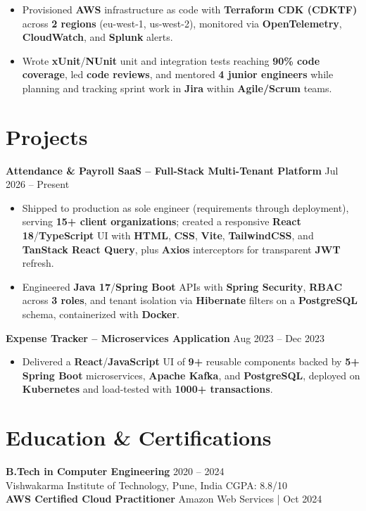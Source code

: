 \documentclass[a4paper,10pt]{article}
\begin{document}
\begin{itemize}[leftmargin=*]
    \item Provisioned \textbf{AWS} infrastructure as code with \textbf{Terraform CDK (CDKTF)} across \textbf{2 regions} (eu-west-1, us-west-2), monitored via \textbf{OpenTelemetry}, \textbf{CloudWatch}, and \textbf{Splunk} alerts.
    \item Wrote \textbf{xUnit}/\textbf{NUnit} unit and integration tests reaching \textbf{90\% code coverage}, led \textbf{code reviews}, and mentored \textbf{4 junior engineers} while planning and tracking sprint work in \textbf{Jira} within \textbf{Agile/Scrum} teams.
\end{itemize}

\section*{Projects}

\textbf{Attendance \& Payroll SaaS -- Full-Stack Multi-Tenant Platform} \hfill Jul 2026 -- Present
\begin{itemize}[leftmargin=*]
    \item Shipped to production as sole engineer (requirements through deployment), serving \textbf{15+ client organizations}; created a responsive \textbf{React 18}/\textbf{TypeScript} UI with \textbf{HTML}, \textbf{CSS}, \textbf{Vite}, \textbf{TailwindCSS}, and \textbf{TanStack React Query}, plus \textbf{Axios} interceptors for transparent \textbf{JWT} refresh.
    \item Engineered \textbf{Java 17}/\textbf{Spring Boot} APIs with \textbf{Spring Security}, \textbf{RBAC} across \textbf{3 roles}, and tenant isolation via \textbf{Hibernate} filters on a \textbf{PostgreSQL} schema, containerized with \textbf{Docker}.
\end{itemize}

\textbf{Expense Tracker -- Microservices Application} \hfill Aug 2023 -- Dec 2023
\begin{itemize}[leftmargin=*]
    \item Delivered a \textbf{React}/\textbf{JavaScript} UI of \textbf{9+} reusable components backed by \textbf{5+} \textbf{Spring Boot} microservices, \textbf{Apache Kafka}, and \textbf{PostgreSQL}, deployed on \textbf{Kubernetes} and load-tested with \textbf{1000+ transactions}.
\end{itemize}

\section*{Education \& Certifications}
\textbf{B.Tech in Computer Engineering} \hfill 2020 -- 2024 \\
Vishwakarma Institute of Technology, Pune, India \hfill CGPA: 8.8/10 \\
\textbf{AWS Certified Cloud Practitioner} \hfill Amazon Web Services \;|\; Oct 2024
\end{document}
